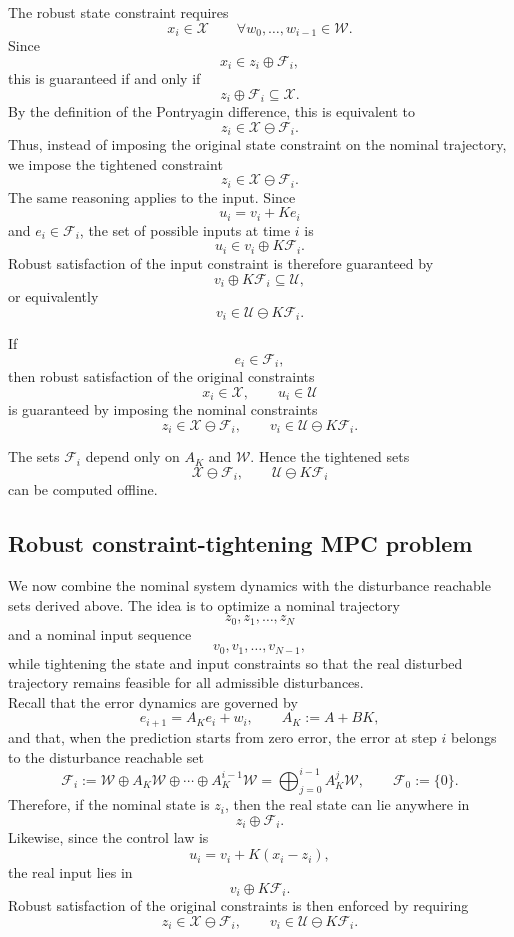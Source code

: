 The robust state constraint requires
\[
    x_i\in\mathcal X
    \qquad
    \forall w_0,\ldots,w_{i-1}\in\mathcal W.
\]
Since
\[
    x_i\in z_i\oplus\mathcal F_i,
\]
this is guaranteed if and only if
\[
    z_i\oplus\mathcal F_i\subseteq\mathcal X.
\]
By the definition of the Pontryagin difference, this is equivalent to
\[
    z_i\in\mathcal X\ominus\mathcal F_i.
\]
Thus, instead of imposing the original state constraint on the nominal trajectory, we impose the
tightened constraint
\[
    z_i\in\mathcal X\ominus\mathcal F_i.
\]
The same reasoning applies to the input. Since
\[
    u_i=v_i+Ke_i
\]
and \(e_i\in\mathcal F_i\), the set of possible inputs at time \(i\) is
\[
    u_i\in v_i\oplus K\mathcal F_i.
\]
Robust satisfaction of the input constraint is therefore guaranteed by
\[
    v_i\oplus K\mathcal F_i\subseteq\mathcal U,
\]
or equivalently
\[
    v_i\in\mathcal U\ominus K\mathcal F_i.
\]

\begin{theorembox}
If
\[
    e_i\in\mathcal F_i,
\]
then robust satisfaction of the original constraints
\[
    x_i\in\mathcal X,\qquad u_i\in\mathcal U
\]
is guaranteed by imposing the nominal constraints
\[
    z_i\in\mathcal X\ominus\mathcal F_i,
    \qquad
    v_i\in\mathcal U\ominus K\mathcal F_i.
\]
\end{theorembox}

The sets \(\mathcal F_i\) depend only on \(A_K\) and \(\mathcal W\). Hence the tightened sets
\[
    \mathcal X\ominus\mathcal F_i,
    \qquad
    \mathcal U\ominus K\mathcal F_i
\]
can be computed offline.

\subsection{Robust constraint-tightening MPC problem}

We now combine the nominal system dynamics with the disturbance reachable sets derived above.
The idea is to optimize a nominal trajectory
\[
    z_0,z_1,\ldots,z_N
\]
and a nominal input sequence
\[
    v_0,v_1,\ldots,v_{N-1},
\]
while tightening the state and input constraints so that the real disturbed trajectory remains
feasible for all admissible disturbances.\\

Recall that the error dynamics are governed by
\[
    e_{i+1}=A_Ke_i+w_i,
    \qquad
    A_K:=A+BK,
\]
and that, when the prediction starts from zero error, the error at step \(i\) belongs to the
disturbance reachable set
\[
    \mathcal F_i
    :=
    \mathcal W\oplus A_K\mathcal W\oplus\cdots\oplus A_K^{i-1}\mathcal W
    =
    \bigoplus_{j=0}^{i-1}A_K^j\mathcal W,
    \qquad
    \mathcal F_0:=\{0\}.
\]
Therefore, if the nominal state is \(z_i\), then the real state can lie anywhere in
\[
    z_i\oplus \mathcal F_i.
\]
Likewise, since the control law is
\[
    u_i=v_i+K(x_i-z_i),
\]
the real input lies in
\[
    v_i\oplus K\mathcal F_i.
\]
Robust satisfaction of the original constraints is then enforced by requiring
\[
    z_i\in \mathcal X\ominus \mathcal F_i,
    \qquad
    v_i\in \mathcal U\ominus K\mathcal F_i.
\]

